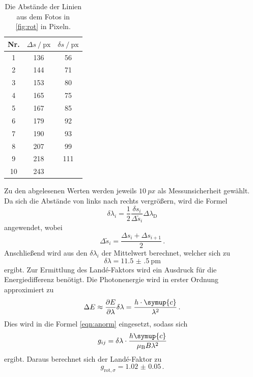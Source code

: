   \begin{table}
    \centering
    \caption{Die Abstände der Linien aus dem Fotos in \autoref{fig:rot} in Pixeln.}
    \label{tab:rotsigmas}
    \begin{tabular}{c S[table-format=3.0] S[table-format=3.0]}
      \toprule
      {Nr.} & {$\Delta s \mathbin{/} \text{px}$} & {$\delta s \mathbin{/} \text{px}$} \\
        &  136   &   56\\
       2  &  144   &   71\\
       3  &  153   &   80\\
       4  &  165   &   75\\
       5  &  167   &   85\\
       6  &  179   &   92\\
       7  &  190   &   93\\
       8  &  207   &   99\\
       9  &  218   &   111\\
      10  &  243     \\
      \bottomrule
    \end{tabular}
  \end{table}

  \noindent Zu den abgelesenen Werten werden jeweils $\SI{10}{px}$ als Messunsicherheit gewählt. Da sich die Abstände von links nach rechts vergrößern,
  wird die Formel 
  \begin{equation}
    \delta \lambda_i = \frac{1}{2} \frac{\delta s_i}{\Delta \tilde{s}_i} \Delta \lambda_\text{D}
    \label{eqn:deltalam}
  \end{equation}
  angewendet, wobei 
  \begin{equation*}
    \Delta \tilde{s}_i = \frac{\Delta s_i + \Delta s_{i+1}}{2}\, .
  \end{equation*} 
  Anschließend wird aus den $\delta \lambda_i$ der Mittelwert berechnet, welcher sich zu 
  \begin{equation*}
    \delta \lambda = \SI{11.5(5)}{\pico\metre}
  \end{equation*}
  ergibt. 
  Zur Ermittlung des Land\'{e}-Faktors wird ein Ausdruck für die Energiedifferenz benötigt. Die Photonenergie wird in erster Ordnung approximiert zu 
  \begin{equation*}
    \Delta E \approx \frac{\partial E}{\partial \lambda} \delta \lambda = \frac{h \cdot \symup{c}}{\lambda^2}\, .
  \end{equation*}
  Dies wird in die Formel \eqref{eqn:anorm} eingesetzt, sodass sich 
  \begin{equation}
    g_{ij} = \delta \lambda \cdot \frac{h \symup{c}}{\mu_\t{B} B \lambda^2}
    \label{eqn:gee}
  \end{equation}
  ergibt.
  Daraus berechnet sich der Land\'{e}-Faktor zu 
  \begin{equation*}
    g_{\text{rot}, \sigma} = \num{1.02(5)}\, .
  \end{equation*}


